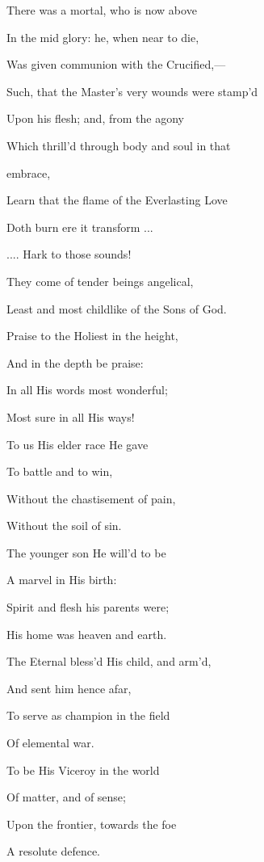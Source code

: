 
There was a mortal, who is now above

In the mid glory: he, when near to die,

Was given communion with the Crucified,—

Such, that the Master's very wounds were stamp'd

Upon his flesh; and, from the agony

Which thrill'd through body and soul in that

embrace,

Learn that the flame of the Everlasting Love

Doth burn ere it transform ...


.... Hark to those sounds!

They come of tender beings angelical,

Least and most childlike of the Sons of God.


Praise to
the Holiest in the height,

And in the depth be praise:

In all
His words most wonderful;

Most sure in all His ways!

To us His
elder race He gave

To battle and to win,

Without
the chastisement of pain,

Without the soil of sin.

The
younger son He will'd to be

A marvel in His birth:

Spirit
and flesh his parents were;

His home was heaven and earth.

The
Eternal bless'd His child, and arm'd,

And sent him hence afar,

To
serve as champion in the field

Of elemental war. 

To be His
Viceroy in the world

Of matter, and of sense;

Upon
the frontier, towards the foe

A resolute defence.


